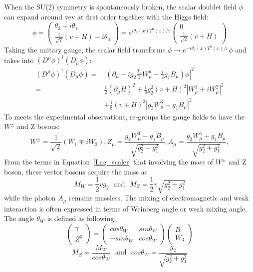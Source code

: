 When the SU(2) symmetry is spontaneously broken, the scalar doublet field $\phi$ can expand around vev at first order together with the Higgs field:
\begin{equation}\label{Higgs_vev_expansion}
\phi=
\begin{pmatrix}
\theta_{2}+i\theta_{1} \\
\frac{1}{\sqrt{2}}(v+H)-i\theta_{3}
\end{pmatrix}
=e^{i\theta_{a}(x)T^{a}(x)/v}
\begin{pmatrix}
0\\
\frac{1}{\sqrt{2}}(v+H)
\end{pmatrix}
\end{equation}
Taking the unitary gauge, the scalar field transforms $\phi \to e^{-i\theta_{a}(x)T^{a}(x)/v}\phi$ and takes into $(D^{\mu}\phi)^{\dagger}(D_{\mu}\phi)$:
\begin{equation}\label{Lag_scaler}
\begin{aligned}
(D^{\mu}\phi)^{\dagger}(D_{\mu}\phi)=&|(\partial_{\mu}-ig_{2}\frac{T_{a}}{2}W^{a}_{\mu}-\frac{i}{2}g_{1}B_{\mu})\phi|^{2}\\
                                                          =&\frac{1}{2}(\partial_{\mu}H)^{2}+\frac{1}{8}g^{2}_{2}(v+H)^{2}|W^{1}_{\mu}+iW^{2}_{\mu}|^{2}\\
                                                            &+\frac{1}{8}(v+H)^{2}|g_{2}W^{3}_{\mu}-g_{1}B_{\mu}|^{2}
\end{aligned}
\end{equation}
To meets the experimental observations, re-groups the gauge fields to have the $W^{\pm}$ and Z bosons: 
\begin{equation}
W^{\pm}=\frac{1}{\sqrt{2}}(W_{1}\mp iW_{2}), Z_{\mu}=\frac{g_{2}W^{3}_{\mu}-g_{1}B_{\mu}}{\sqrt{g_{2}^{2}+g^{2}_{1}}},A_{\mu}=\frac{g_{2}W^{3}_{\mu}+g_{1}B_{\mu}}{\sqrt{g_{2}^{2}+g^{2}_{1}}},
\end{equation}
From the terms in Equation~\ref{Lag_scaler} that involving the mass of $W^{\pm}$ and Z boson, these vector bosons acquire the mass as
\begin{equation}
M_{W}=\frac{1}{2}vg_{2}~~~\textrm{and}~~~M_{Z}=\frac{1}{2}v\sqrt{g^{2}_{2}+g^{2}_{1}}
\end{equation}
while the photon $A_{\mu}$ remains massless. The mixing of electromagnetic and weak interaction is often expressed in terms of Weinberg angle or weak mixing angle. The angle $\theta_{W}$ is defined as following:
\[
\begin{pmatrix}
\gamma    \\
Z^{0}
\end{pmatrix}
=
\begin{pmatrix}
cos\theta_{W}  & sin\theta_{W} \\
-sin\theta_{W}  & cos\theta_{W}
\end{pmatrix}
\begin{pmatrix}
B\\
W_{3}
\end{pmatrix}
\]
\begin{equation}
M_{Z}=\frac{M_{W}}{cos\theta_{W}}~~~ \textrm{and}~~~
cos\theta_{W}=\frac{g_{2}}{\sqrt{g_{2}^{2}+g_{1}^{2}}}
\end{equation}

